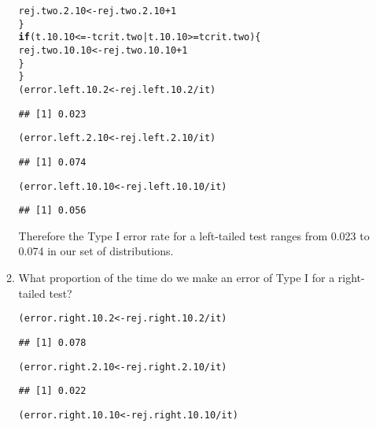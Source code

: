 \documentclass{article}\usepackage[]{graphicx}\usepackage[]{xcolor}
\makeatletter
\newcommand{\hlnum}[1]{\textcolor[rgb]{0.686,0.059,0.569}{#1}}%
\newcommand{\hlopt}[1]{\textcolor[rgb]{0,0,0}{#1}}%
\newcommand{\hldef}[1]{\textcolor[rgb]{0.345,0.345,0.345}{#1}}%
\newcommand{\hlkwa}[1]{\textcolor[rgb]{0.161,0.373,0.58}{\textbf{#1}}}%
\newcommand{\hlkwb}[1]{\textcolor[rgb]{0.69,0.353,0.396}{#1}}%
\newenvironment{kframe}{%
 \def\at@end@of@kframe{}%
 \ifinner\ifhmode%
  \def\at@end@of@kframe{\end{minipage}}%
  \begin{minipage}{\columnwidth}%
 \fi\fi%
 \def\FrameCommand##1{\hskip\@totalleftmargin \hskip-\fboxsep
 \colorbox{shadecolor}{##1}\hskip-\fboxsep
     \hskip-\linewidth \hskip-\@totalleftmargin \hskip\columnwidth}%
 \MakeFramed {\advance\hsize-\width
   \@totalleftmargin\z@ \linewidth\hsize
   \@setminipage}}%
 {\par\unskip\endMakeFramed%
 \at@end@of@kframe}
\newenvironment{knitrout}{}{} %
\makeatother
\begin{document}
\begin{enumerate}
\begin{enumerate}
\begin{knitrout}
\begin{kframe}
\begin{alltt}
    \hldef{rej.two.2.10} \hlkwb{<-} \hldef{rej.two.2.10} \hlopt{+} \hlnum{1}
  \hldef{\}}
  \hlkwa{if}\hldef{(t.10.10} \hlopt{<= -}\hldef{tcrit.two} \hlopt{|} \hldef{t.10.10} \hlopt{>=} \hldef{tcrit.two)\{}
    \hldef{rej.two.10.10} \hlkwb{<-} \hldef{rej.two.10.10} \hlopt{+} \hlnum{1}
  \hldef{\}}
\hldef{\}}
\hldef{(error.left.10.2} \hlkwb{<-} \hldef{rej.left.10.2} \hlopt{/} \hldef{it)}
\end{alltt}
\begin{verbatim}
## [1] 0.023
\end{verbatim}
\begin{alltt}
\hldef{(error.left.2.10} \hlkwb{<-} \hldef{rej.left.2.10} \hlopt{/} \hldef{it)}
\end{alltt}
\begin{verbatim}
## [1] 0.074
\end{verbatim}
\begin{alltt}
\hldef{(error.left.10.10} \hlkwb{<-} \hldef{rej.left.10.10} \hlopt{/} \hldef{it)}
\end{alltt}
\begin{verbatim}
## [1] 0.056
\end{verbatim}
\end{kframe}
\end{knitrout}
Therefore the Type I error rate for a left-tailed test ranges from 0.023 to 0.074 in our set of distributions.
    \item What proportion of the time do we make an error of Type I for a
    right-tailed test?
\begin{knitrout}\scriptsize
{}\color{fgcolor}\begin{kframe}
\begin{alltt}
\hldef{(error.right.10.2} \hlkwb{<-} \hldef{rej.right.10.2} \hlopt{/} \hldef{it)}
\end{alltt}
\begin{verbatim}
## [1] 0.078
\end{verbatim}
\begin{alltt}
\hldef{(error.right.2.10} \hlkwb{<-} \hldef{rej.right.2.10} \hlopt{/} \hldef{it)}
\end{alltt}
\begin{verbatim}
## [1] 0.022
\end{verbatim}
\begin{alltt}
\hldef{(error.right.10.10} \hlkwb{<-} \hldef{rej.right.10.10} \hlopt{/} \hldef{it)}
\end{alltt}
\begin{verbatim}

\end{verbatim}
\end{kframe}
\end{knitrout}
\end{enumerate}
\end{enumerate}
\end{document}
